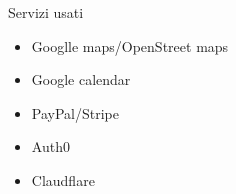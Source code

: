 \documentclass{article}
\begin{document}

\pagebreak

\tableofcontents
\pagebreak









Servizi usati
\begin{itemize}
    \item Googlle maps/OpenStreet maps
    \item Google calendar
    \item PayPal/Stripe
    \item Auth0
    \item Claudflare
\end{itemize}
\end{document}
